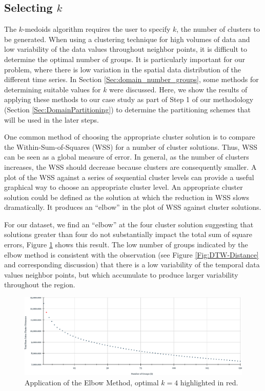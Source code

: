 \subsection{Selecting $k$}
\label{Sec:Selectk}

The $k$-medoids algorithm requires the user to specify $k$, the number of clusters to be generated. When using a clustering technique for high volumes of data and low variability of the data values throughout neighbor points, it is difficult to determine the optimal number of groups. It is particularly important for our problem, where there is low variation in the spatial data distribution of the different time series. In Section \ref{Sec:domain_number_groups}, some methods for determining suitable values for $k$ were discussed. Here, we show the results of applying these methods to our case study as part of Step 1 of our methodology (Section \ref{Sec:DomainPartitioning}) to determine the partitioning schemes that will be used in the later steps.

One common method of choosing the appropriate cluster solution is to compare the Within-Sum-of-Squares (WSS) for a number of cluster solutions. Thus, WSS can be seen as a global measure of error. In general, as the number of clusters increases, the WSS should decrease because clusters are consequently smaller. A plot of the WSS against a series of sequential cluster levels can provide a useful graphical way to choose an appropriate cluster level. An appropriate cluster solution could be defined as the solution at which the reduction in WSS slows dramatically. It produces an ``elbow'' in the plot of WSS against cluster solutions. 

For our dataset, we find an ``elbow'' at the four cluster solution suggesting that solutions greater than four do not substantially impact the total sum of square errors, Figure \ref{Fig:SSE-kMedoids} shows this result. The low number of groups indicated by the elbow method is consistent with the observation (see Figure \ref{Fig:DTW-Distance} and corresponding discussion) that there is a low variability of the temporal data values neighbor points, but which accumulate to produce larger variability throughout the region.

\begin{figure}[h]
	\centering
	\includegraphics[scale=0.5]{../Figures/Elbow-Kmedoids}
	\caption{Application of the Elbow Method, optimal $k=4$ highlighted in red.}
	\label{Fig:SSE-kMedoids}
\end{figure}

